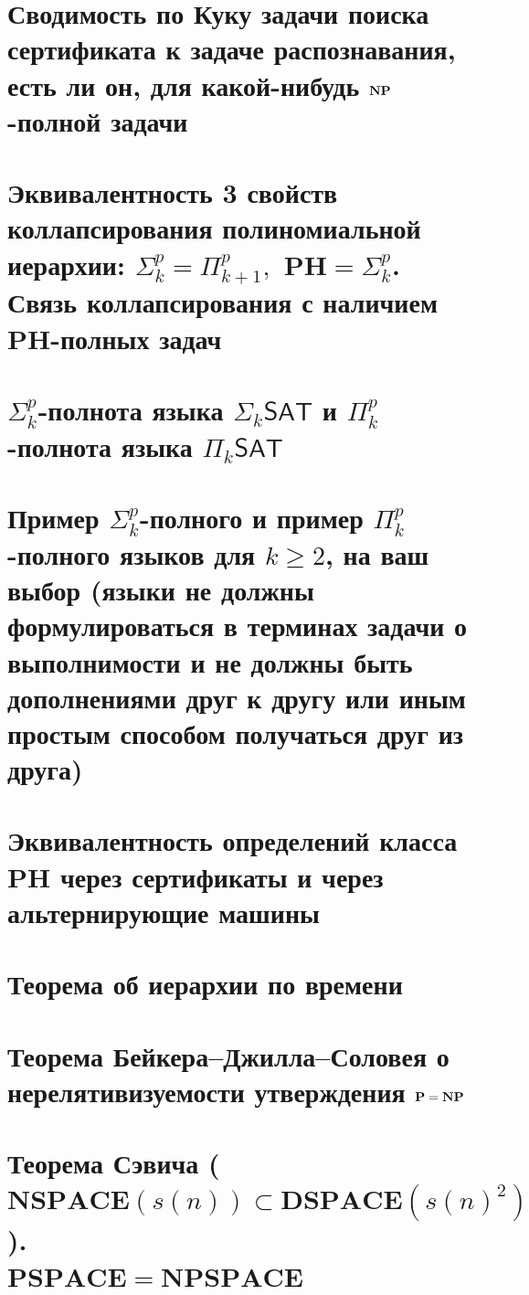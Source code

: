 \section{Сводимость по Куку задачи поиска сертификата к задаче распознавания, есть ли он, для какой-нибудь $\textbf{NP}$-полной задачи}

\section{Эквивалентность 3 свойств коллапсирования полиномиальной иерархии: $\Sigma_k^p = \Pi_{k+1}^p,$ $\mathbf{PH} = \Sigma_k^p$. Связь коллапсирования с наличием $\mathbf{PH}$-полных задач}


\section{$\Sigma_k^p$-полнота языка $\Sigma_k\mathsf{SAT}$ и $\Pi_k^p$-полнота языка $\Pi_k\mathsf{SAT}$}


\section{Пример $\Sigma_k^p$-полного и пример $\Pi_k^p$-полного языков для $k \ge 2$, на ваш выбор (языки
не должны формулироваться в терминах задачи о выполнимости и не должны быть дополнениями друг к другу или иным простым способом получаться друг из друга)}



\section{Эквивалентность определений класса $\mathbf{PH}$ через сертификаты и через альтернирующие машины}


\section{Теорема об иерархии по времени}

\section{Теорема Бейкера–Джилла–Соловея о нерелятивизуемости утверждения $\textbf{P} = \textbf{NP}$}


\section{Теорема Сэвича ($\mathbf{NSPACE}(s(n)) \subset \mathbf{DSPACE}(s(n)^2)$).\\$\mathbf{PSPACE} = \mathbf{NPSPACE}$}\label{sec:savitch}


